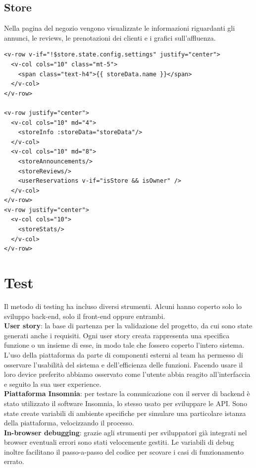 \documentclass[a4paper]{report}
\begin{document}
\section{Store}
Nella pagina del negozio vengono visualizzate le informazioni riguardanti gli annunci, le reviews, le prenotazioni dei clienti e i grafici sull’affluenza.

\begin{lstlisting}
<v-row v-if="!$store.state.config.settings" justify="center">
  <v-col cols="10" class="mt-5">
    <span class="text-h4">{{ storeData.name }}</span>
  </v-col>
</v-row>
                
<v-row justify="center">
  <v-col cols="10" md="4">
    <storeInfo :storeData="storeData"/>
  </v-col>
  <v-col cols="10" md="8">
    <storeAnnouncements/>
    <storeReviews/>
    <userReservations v-if="isStore && isOwner" />
  </v-col>
</v-row>
<v-row justify="center">
  <v-col cols="10">
    <storeStats/>
  </v-col>
</v-row>
\end{lstlisting}



\chapter{Test}

Il metodo di testing ha incluso diversi strumenti. Alcuni hanno coperto solo lo sviluppo back-end, solo il front-end oppure entrambi.\\

\textbf{User story}: la base di partenza per la validazione del progetto, da cui sono state generati anche i requisiti. Ogni user story creata rappresenta una specifica funzione o un insieme di esse, in modo tale che fossero coperto l’intero sistema.
L’uso della piattaforma da parte di componenti esterni al team ha permesso di osservare l’usabilità del sistema e dell’efficienza delle funzioni. Facendo usare il loro device preferito abbiamo osservato come l’utente abbia reagito all’interfaccia e seguito la sua user experience.\\

\textbf{Piattaforma Insomnia}: per testare la comunicazione con il server di backend è stato utilizzato il software Insomnia, lo stesso usato per sviluppare le API. Sono state create variabili di ambiente specifiche per simulare una particolare istanza della piattaforma, velocizzando il processo.\\

\textbf{In-browser debugging}: grazie agli strumenti per sviluppatori già integrati nel browser eventuali errori sono stati velocemente gestiti. Le variabili di debug inoltre facilitano il passo-a-passo del codice per scovare i casi di funzionamento errato.
\end{document}
